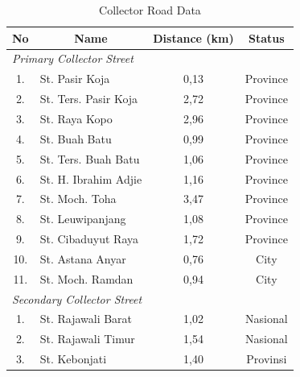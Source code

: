 \begin{table}[H] 
\centering
\begin{tabular}{|c|c|c|c|}
\hline
\rowcolor{gray}
\textbf{No} & \textbf{Name} & \textbf{Distance (km)} & \textbf{Status} \\
\hline
\multicolumn{2}{|l|}{\textit{Primary Collector Street}} &  & \\
\cline{1-4}
1. & \multicolumn{1}{|l|}{St. Pasir Koja} & 0,13 & Province \\
\cline{1-4}
2. & \multicolumn{1}{|l|}{St. Ters. Pasir Koja} & 2,72 & Province \\
\cline{1-4}
3. & \multicolumn{1}{|l|}{St. Raya Kopo} & 2,96 & Province \\
\cline{1-4}
4. & \multicolumn{1}{|l|}{St. Buah Batu} & 0,99 & Province \\
\cline{1-4}
5. & \multicolumn{1}{|l|}{St. Ters. Buah Batu} & 1,06 & Province \\
\cline{1-4}
6. & \multicolumn{1}{|l|}{St. H. Ibrahim Adjie} & 1,16 & Province \\
\cline{1-4}
7. & \multicolumn{1}{|l|}{St. Moch. Toha} & 3,47 & Province \\
\cline{1-4}
8. & \multicolumn{1}{|l|}{St. Leuwipanjang} & 1,08 & Province \\
\cline{1-4}
9. & \multicolumn{1}{|l|}{St. Cibaduyut Raya} & 1,72 & Province \\
\cline{1-4}
10. & \multicolumn{1}{|l|}{St. Astana Anyar} & 0,76 & City \\
\cline{1-4}
11. & \multicolumn{1}{|l|}{St. Moch. Ramdan} & 0,94 & City \\
\cline{1-4}
\multicolumn{2}{|l|}{\textit{Secondary Collector Street}} &  & \\
\cline{1-4}
1. & \multicolumn{1}{|l|}{St. Rajawali Barat} & 1,02 & Nasional \\
\cline{1-4}
2. & \multicolumn{1}{|l|}{St. Rajawali Timur} & 1,54 & Nasional \\
\cline{1-4}
3. & \multicolumn{1}{|l|}{St. Kebonjati} & 1,40 & Provinsi \\
\hline
\end{tabular}
\caption{Collector Road Data}
\label{table:street_data1}
\end{table}

\pagebreak

